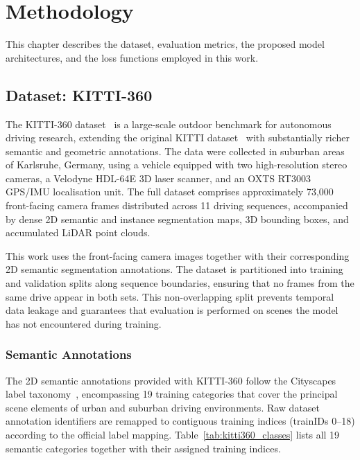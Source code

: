 \chapter{Methodology}
\label{ch:methodology}

This chapter describes the dataset, evaluation metrics, the proposed model architectures, and the loss functions employed in this work.

\FloatBarrier
\section{Dataset: KITTI-360}
\label{sec:dataset}

The KITTI-360 dataset~\cite{liao2022kitti360} is a large-scale outdoor benchmark for autonomous driving research, extending the original KITTI dataset~\cite{geiger2012are} with substantially richer semantic and geometric annotations. The data were collected in suburban areas of Karlsruhe, Germany, using a vehicle equipped with two high-resolution stereo cameras, a Velodyne HDL-64E 3D laser scanner, and an OXTS RT3003 GPS/IMU localisation unit. The full dataset comprises approximately 73,000 front-facing camera frames distributed across 11 driving sequences, accompanied by dense 2D semantic and instance segmentation maps, 3D bounding boxes, and accumulated LiDAR point clouds.

This work uses the front-facing camera images together with their corresponding 2D semantic segmentation annotations. The dataset is partitioned into training and validation splits along sequence boundaries, ensuring that no frames from the same drive appear in both sets. This non-overlapping split prevents temporal data leakage and guarantees that evaluation is performed on scenes the model has not encountered during training.

\subsection{Semantic Annotations}
\label{subsec:semantic_annotations}

The 2D semantic annotations provided with KITTI-360 follow the Cityscapes label taxonomy~\cite{cordts2016cityscapes}, encompassing 19 training categories that cover the principal scene elements of urban and suburban driving environments. Raw dataset annotation identifiers are remapped to contiguous training indices (trainIDs 0--18) according to the official label mapping. Table~\ref{tab:kitti360_classes} lists all 19 semantic categories together with their assigned training indices.

